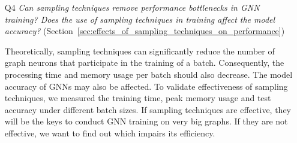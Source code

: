 \begin{itemize}
    \item[Q4] \emph{Can sampling techniques remove performance bottlenecks in GNN training? Does the use of sampling techniques in training affect the model accuracy?} (Section~\ref{sec:effects_of_sampling_techniques_on_performance})

          Theoretically, sampling techniques can significantly reduce the number of graph neurons that participate in the training of a batch.
          Consequently, the processing time and memory usage per batch should also decrease.
          The model accuracy of GNNs may also be affected.
          To validate effectiveness of sampling techniques, we measured the training time, peak memory usage and test accuracy under different batch sizes.
          If sampling techniques are effective, they will be the keys to conduct GNN training on very big graphs.
          If they are not effective, we want to find out which impairs its efficiency.

\end{itemize}